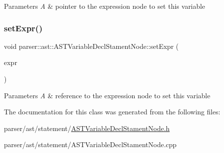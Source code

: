 \begin{DoxyParams}{Parameters}
{\em A} & pointer to the expression node to set this variable \\
\hline
\end{DoxyParams}
\mbox{\label{classparser_1_1ast_1_1ASTVariableDeclStamentNode_a3c075b31e47c5f527bf16bc783a67181}} 
\subsubsection{\texorpdfstring{set\+Expr()}{setExpr()}\hspace{0.1cm}{\footnotesize\ttfamily [2/2]}}
{\footnotesize\ttfamily void parser\+::ast\+::\+A\+S\+T\+Variable\+Decl\+Stament\+Node\+::set\+Expr (\begin{DoxyParamCaption}\item[{const \hyperlink{classparser_1_1ast_1_1ASTExprNode}{A\+S\+T\+Expr\+Node} \&}]{expr }\end{DoxyParamCaption})}


\begin{DoxyParams}{Parameters}
{\em A} & reference to the expression node to set this variable \\
\hline
\end{DoxyParams}


The documentation for this class was generated from the following files\+:\begin{DoxyCompactItemize}
\item 
parser/ast/statement/\hyperlink{ASTVariableDeclStamentNode_8h}{A\+S\+T\+Variable\+Decl\+Stament\+Node.\+h}\item 
parser/ast/statement/A\+S\+T\+Variable\+Decl\+Stament\+Node.\+cpp\end{DoxyCompactItemize}
